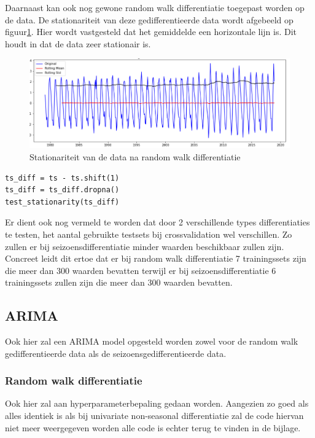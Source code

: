 Daarnaast kan ook nog gewone random walk differentiatie toegepast worden op de data. De stationariteit van deze gedifferentieerde data wordt afgebeeld op figuur\ref{fig:uvsstationarityrw}. Hier wordt vastgesteld dat het gemiddelde een horizontale lijn is. Dit houdt in dat de data zeer stationair is.

\begin{figure}
    \centering
    \caption{Stationariteit van de data na random walk differentiatie}
    \label{fig:uvsstationarityrw}
    \includegraphics[width=1\linewidth]{uvsstationarityrw}
\end{figure}


\begin{verbatim}
ts_diff = ts - ts.shift(1)
ts_diff = ts_diff.dropna()
test_stationarity(ts_diff)
\end{verbatim}

Er dient ook nog vermeld te worden dat door 2 verschillende types differentiaties te testen, het aantal gebruikte testsets bij crossvalidation wel verschillen. Zo zullen er bij seizoensdifferentiatie minder waarden beschikbaar zullen zijn. Concreet leidt dit ertoe dat er bij random walk differentiatie 7 trainingssets zijn die meer dan 300 waarden bevatten terwijl er bij seizoensdifferentiatie 6 trainingssets zullen zijn die meer dan 300 waarden bevatten.

\subsection{ARIMA}

Ook hier zal een ARIMA model opgesteld worden zowel voor de random walk gedifferentieerde data als de seizoensgedifferentieerde data.
\subsubsection{Random walk differentiatie}

Ook hier zal aan hyperparameterbepaling gedaan worden. Aangezien zo goed als alles identiek is als bij univariate non-seasonal differentiatie zal de code hiervan niet meer weergegeven worden alle code is echter terug te vinden in de bijlage.

